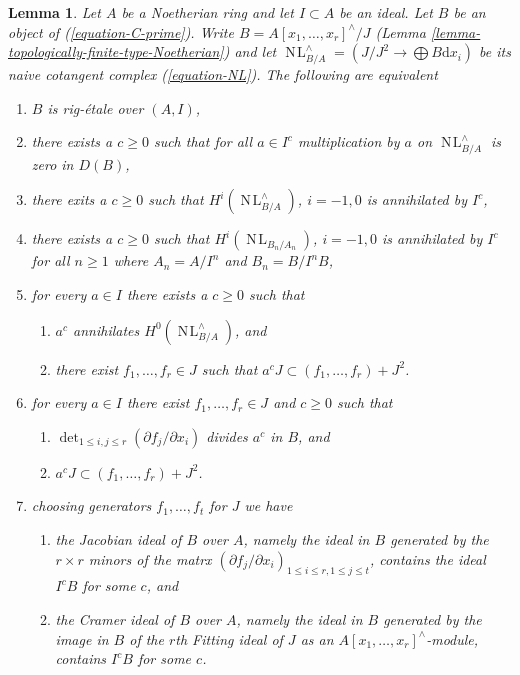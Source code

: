 \documentclass{stacks-project}
\theoremstyle{plain}
\newtheorem{lemma}[subsection]{Lemma}
\theoremstyle{definition}
\theoremstyle{remark}
\numberwithin{equation}{subsection}
\def\NL{\mathop{N\!L}\nolimits}
\begin{document}
\begin{lemma}
\label{lemma-equivalent-with-artin}
Let $A$ be a Noetherian ring and let $I \subset A$ be an ideal.
Let $B$ be an object of (\ref{equation-C-prime}). Write
$B = A[x_1, \ldots, x_r]^\wedge/J$
(Lemma \ref{lemma-topologically-finite-type-Noetherian})
and let $\NL_{B/A}^\wedge = (J/J^2 \to \bigoplus B\text{d}x_i)$
be its naive cotangent complex (\ref{equation-NL}).
The following are equivalent
\begin{enumerate}
\item $B$ is rig-\'etale over $(A, I)$,
\item
\label{item-zero-on-NL}
there exists a $c \geq 0$ such that for all $a \in I^c$ multiplication by $a$
on $\NL_{B/A}^\wedge$ is zero in $D(B)$,
\item
\label{item-zero-on-cohomology-NL}
there exits a $c \geq 0$ such that $H^i(\NL_{B/A}^\wedge)$, $i = -1, 0$ is
annihilated by $I^c$,
\item
\label{item-zero-on-cohomology-NL-truncations}
there exists a $c \geq 0$ such that $H^i(\NL_{B_n/A_n})$, $i = -1, 0$ is
annihilated by $I^c$ for all $n \geq 1$ where $A_n = A/I^n$ and $B_n = B/I^nB$,
\item
\label{item-condition-artin-pre-pre}
for every $a \in I$ there exists a $c \geq 0$ such that
\begin{enumerate}
\item $a^c$ annihilates $H^0(\NL_{B/A}^\wedge)$, and
\item there exist $f_1, \ldots, f_r \in J$ such that
$a^c J \subset (f_1, \ldots, f_r) + J^2$.
\end{enumerate}
\item
\label{item-condition-artin-pre}
for every $a \in I$ there exist $f_1, \ldots, f_r \in J$ and $c \geq 0$
such that
\begin{enumerate}
\item $\det_{1 \leq i, j \leq r}(\partial f_j/\partial x_i)$ divides
$a^c$ in $B$, and
\item $a^c J \subset (f_1, \ldots, f_r) + J^2$.
\end{enumerate}
\item
\label{item-condition-artin}
choosing generators $f_1, \ldots, f_t$ for $J$ we have
\begin{enumerate}
\item the Jacobian ideal of $B$ over $A$, namely the ideal in $B$
generated by the $r \times r$ minors of the matrx
$(\partial f_j/\partial x_i)_{1 \leq i \leq r, 1 \leq j \leq t}$,
contains the ideal $I^cB$ for some $c$, and
\item the Cramer ideal of $B$ over $A$, namely the ideal in $B$
generated by the image in $B$ of the $r$th Fitting ideal of $J$
as an $A[x_1, \ldots, x_r]^\wedge$-module, contains $I^cB$ for some $c$.
\end{enumerate}
\end{enumerate}
\end{lemma}
\end{document}
